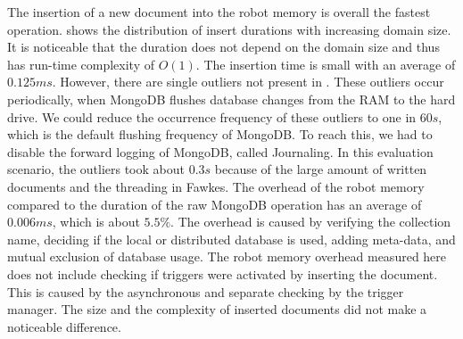 The insertion of a new document into the robot memory is overall the
fastest operation.
 shows the distribution of
insert durations with increasing domain size. It is noticeable that the
duration does not depend on the domain size and thus has run-time
complexity of $O(1)$. The insertion time is small with an average of
$0.125ms$. However, there are single outliers not present in
. These outliers occur periodically, when
MongoDB flushes database changes from the RAM to the hard drive. We
could reduce the occurrence frequency of these outliers to one in $60s$, which is the
default flushing frequency of MongoDB. To reach this, we had to
disable the forward logging of MongoDB, called Journaling. In this
evaluation scenario, the outliers took about $0.3s$ because of the
large amount of written documents and the threading in Fawkes.  The
overhead of the robot memory compared to the duration of the raw
MongoDB operation has an average of $0.006ms$, which is about $5.5\%$.
The overhead is caused by verifying the collection name, deciding if
the local or distributed database is used, adding meta-data, and
mutual exclusion of database usage. The robot memory overhead measured
here does not include checking if triggers were activated by inserting
the document. This is caused by the asynchronous and separate checking by
the trigger manager. The size and the complexity of inserted
documents did not make a noticeable difference.

